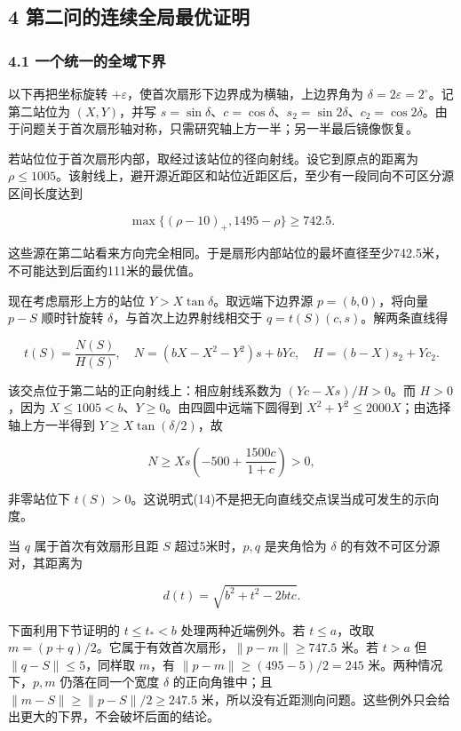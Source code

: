 \documentclass[
  11pt,
  fontset=none]{ctexart}
\begin{document}
\subsection{4
第二问的连续全局最优证明}\label{ux7b2cux4e8cux95eeux7684ux8fdeux7eedux5168ux5c40ux6700ux4f18ux8bc1ux660e}

\subsubsection{4.1
一个统一的全域下界}\label{ux4e00ux4e2aux7edfux4e00ux7684ux5168ux57dfux4e0bux754c}

以下再把坐标旋转 \(+\varepsilon\)，使首次扇形下边界成为横轴，上边界角为
\(\delta=2\varepsilon=2^\circ\)。记第二站位为 \((X,Y)\)，并写
\(s=\sin\delta\)、\(c=\cos\delta\)、\(s_2=\sin2\delta\)、\(c_2=\cos2\delta\)。由于问题关于首次扇形轴对称，只需研究轴上方一半；另一半最后镜像恢复。

若站位位于首次扇形内部，取经过该站位的径向射线。设它到原点的距离为
\(\rho\le1005\)。该射线上，避开源近距区和站位近距区后，至少有一段同向不可区分源区间长度达到

\[
\max\{(\rho-10)_{\text{+}},1495-\rho\}\ge742.5. \tag{13}
\]

这些源在第二站看来方向完全相同。于是扇形内部站位的最坏直径至少742.5米，不可能达到后面约111米的最优值。

现在考虑扇形上方的站位 \(Y>X\tan\delta\)。取远端下边界源
\(p=(b,0)\)，将向量 \(p-S\) 顺时针旋转
\(\delta\)，与首次上边界射线相交于 \(q=t(S)(c,s)\)。解两条直线得

\[
t(S)=\frac{N(S)}{H(S)},\quad
N=(bX-X^2-Y^2)s+bYc,\quad
H=(b-X)s_2+Yc_2. \tag{14}
\]

该交点位于第二站的正向射线上：相应射线系数为 \((Yc-Xs)/H>0\)。而
\(H>0\)，因为 \(X\le1005<b\)、\(Y\ge0\)。由四圆中远端下圆得到
\(X^2+Y^2\le2000X\)；由选择轴上方一半得到 \(Y\ge X\tan(\delta/2)\)，故

\[
N\ge Xs\left(-500+\frac{1500c}{1+c}\right)>0,
\]

非零站位下
\(t(S)>0\)。这说明式(14)不是把无向直线交点误当成可发生的示向度。

当 \(q\) 属于首次有效扇形且距 \(S\) 超过5米时，\(p,q\) 是夹角恰为
\(\delta\) 的有效不可区分源对，其距离为

\[
d(t)=\sqrt{b^2+t^2-2btc}. \tag{15}
\]

下面利用下节证明的 \(t\le t_{\text{*}}<b\) 处理两种近端例外。若
\(t\le a\)，改取 \(m=(p+q)/2\)。它属于有效首次扇形，\(\|p-m\|\ge747.5\)
米。若 \(t>a\) 但 \(\|q-S\|\le5\)，同样取 \(m\)，有
\(\|p-m\|\ge(495-5)/2=245\) 米。两种情况下，\(p,m\) 仍落在同一个宽度
\(\delta\) 的正向角锥中；且 \(\|m-S\|\ge\|p-S\|/2\ge247.5\)
米，所以没有近距测向问题。这些例外只会给出更大的下界，不会破坏后面的结论。
\end{document}
